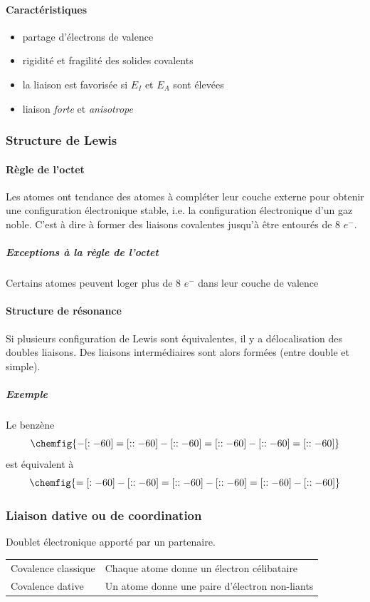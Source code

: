 \documentclass[11pt,a4paper,french]{article}
\begin{document}
\paragraph{Caractéristiques}
\begin{itemize}
	\item partage d'électrons de valence
	\item rigidité et fragilité des solides covalents
	\item la liaison est favorisée si $E_I$ et $E_A$ sont élevées
	\item liaison \emph{forte} et \emph{anisotrope}
\end{itemize}
\subsubsection{Structure de Lewis}
\paragraph{Règle de l'octet}
Les atomes ont tendance des atomes à compléter leur couche externe pour obtenir une configuration électronique stable, i.e. la configuration électronique d'un gaz noble.
C'est à dire à former des liaisons covalentes jusqu'à être entourés de 8 $e^-$.
\subparagraph{Exceptions à la règle de l'octet}
Certains atomes peuvent loger plus de 8 $e^-$ dans leur couche de valence

\paragraph{Structure de résonance}
Si plusieurs configuration de Lewis sont équivalentes, il y a délocalisation des doubles liaisons.
Des liaisons intermédiaires sont alors formées (entre double et simple).
\subparagraph{Exemple} Le benzène
$$\chemfig{-[:-60]=[::-60]-[::-60]=[::-60]-[::-60]=[::-60]}$$ est équivalent à $$\chemfig{=[:-60]-[::-60]=[::-60]-[::-60]=[::-60]-[::-60]}$$

\subsubsection{Liaison dative ou de coordination}
Doublet électronique apporté par un partenaire.

\begin{center}
	\begin{tabular}{ll}
		Covalence classique & Chaque atome donne un électron célibataire\\
		Covalence dative & Un atome donne une paire d'électron non-liants
	\end{tabular}
\end{center}
\end{document}
